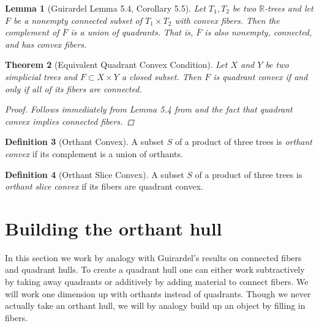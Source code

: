 \documentclass[12pt,parskip=full]{report}
\theoremstyle{plain}
\newtheorem{thm}{Theorem}[section]
\newtheorem{lem}[thm]{Lemma}
\theoremstyle{definition}
\newtheorem{dfn}[thm]{Definition}
\begin{document}
\begin{lem}
	[Guirardel Lemma 5.4, Corollary 5.5]
    \label{lem:guirardel} 
	Let \(T_{1} , T_{2}\) be two \(\mathbb{R}\)-trees and let \(F\) be a nonempty connected subset of \(T_{1} \times T_{2}\) with convex fibers. Then the complement of \(\overline{F}\) is a union of quadrants. That is, \(\overline{F}\) is also nonempty, connected, and has convex fibers.
\end{lem}

\begin{thm}
    [Equivalent Quadrant Convex Condition]
    \label{thm:guirardelsliceconvex}
    Let \(X\) and \(Y\) be two simplicial trees and \(F\subset X\times Y\) a closed subset. Then \(F\) is quadrant convex if and only if all of its fibers are connected.
    \begin{proof}
        Follows immediately from Lemma 5.4 from \cite{guirardelcorepaper} and the fact that  quadrant convex implies connected fibers.
    \end{proof}
\end{thm}

\begin{dfn}
    [Orthant Convex]
    A subset \(S\) of a product of three trees is \emph{orthant convex} if its complement is a union of orthants.
\end{dfn}

\begin{dfn}
    [Orthant Slice Convex]
    A subset \(S\) of a product of three trees is \emph{orthant slice convex} if its fibers are quadrant convex.
\end{dfn}

\chapter{Building the orthant hull}

In this section we work by analogy with Guirardel's results on connected fibers and quadrant hulls. To create a quadrant hull one can either work subtractively by taking away quadrants or additively by adding material to connect fibers. We will work one dimension up with orthants instead of quadrants. Though we never actually take an orthant hull, we will by analogy build up an object by filling in fibers.
\end{document}

